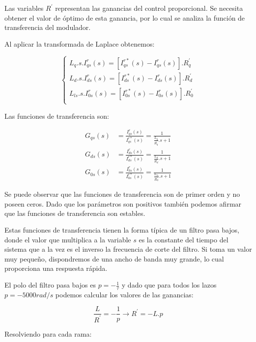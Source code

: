 \documentclass{article}
\begin{document}
Las variables $R^\prime$ representan las ganancias del control proporcional. Se necesita obtener 
el valor de óptimo de esta ganancia, por lo cual se analiza la función de transferencia del modulador.

Al aplicar la transformada de Laplace obtenemos:

\begin{equation}
    \begin{cases}
        L_q. s.I_{qs}^r(s) = [I_{qs}^{r*}(s) - I_{qs}^r(s)].R_q^\prime \\
        L_d. s.I_{ds}^r(s) = [I_{ds}^{r*}(s) - I_{ds}^r(s)].R_d^\prime \\
        L_{ls}. s.I_{0s}^r(s) = [I_{0s}^{r*}(s) - I_{0s}^r(s)].R_{0}^\prime \\
    \end{cases}
\end{equation}

Las funciones de transferencia son:

\begin{align*}
    G_{qs}(s) &= \frac{I_{qs}^r(s)}{I_{qs}^{r*}(s)} = \frac{1}{\frac{L_q}{R_q^\prime}.s + 1}  \\
    G_{ds}(s) &= \frac{I_{ds}^r(s)}{I_{ds}^{r*}(s)} = \frac{1}{\frac{L_d}{R_d^\prime}.s + 1}  \\
    G_{0s}(s) &= \frac{I_{0s}^r(s)}{I_{0s}^{r*}(s)} = \frac{1}{\frac{L_{ls}}{R_{0}^\prime}.s + 1}
\end{align*}

Se puede observar que las funciones de transferencia son de primer orden y no poseen ceros. Dado que
los parámetros son positivos también podemos afirmar que las funciones de transferencia son estables.

Estas funciones de transferencia tienen la forma típica de un filtro pasa bajos, donde el valor que
multiplica a la variable $s$ es la constante del tiempo del sistema \tau que a la vez es el inverso
la frecuencia de corte del filtro. Si \tau toma un valor muy pequeño, dispondremos de una ancho de 
banda muy grande, lo cual proporciona una respuesta rápida.

El polo del filtro pasa bajos es $p = -\frac{1}{\tau}$ y dado que para todos los lazos $p = -5000 rad/s$
podemos calcular los valores de las ganancias:

\begin{equation}
    \frac{L}{R^\prime} = -\frac{1}{p} \to R^\prime = -L.p
\end{equation}

Resolviendo para cada rama:
\end{document}

